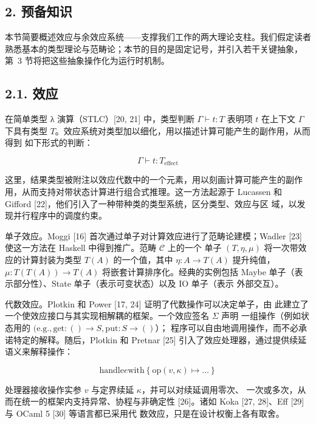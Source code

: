 \subsection{2. 预备知识}\label{preliminaries}

本节简要概述效应与余效应系统——支撑我们工作的两大理论支柱。我们假定读者
熟悉基本的类型理论与范畴论；本节的目的是固定记号，并引入若干关键抽象，
第~3 节将把这些抽象操作化为运行时机制。

\subsection{2.1. 效应}\label{efects}

在简单类型 λ 演算（STLC）{[}20, 21{]} 中，类型判断
\(\Gamma \vdash t : T\) 表明项 \(t\) 在上下文 $\Gamma$ 下具有类型
\(T\)。效应系统对类型加以细化，用以描述计算可能产生的副作用，从而得到
如下形式的判断：

\[
\Gamma \vdash t : T _ { \mathrm { e f f e c t } }\tag{1}
\]

这里，结果类型被附注以效应代数中的一个元素，用以刻画计算可能产生的副作
用，从而支持对带状态计算进行组合式推理。这一方法起源于 Lucassen 和
Gifford {[}22{]}，他们引入了一种带种类的类型系统，区分类型、效应与区
域，以发现并行程序中的调度约束。

单子效应。Moggi {[}16{]} 首次通过单子对计算效应进行了范畴论建模；Wadler
{[}23{]} 使这一方法在 Haskell 中得到推广。范畴 \(\mathcal{C}\) 上的一个
单子 \(( T , \eta , \mu )\) 将一次带效应的计算封装为类型 \(T ( A )\)
的一个值，其中 \(\eta : A \to T ( A )\) 提升纯值，
\(\mu : T ( T ( A ) ) \to T ( A )\) 将嵌套计算排序化。经典的实例包括
Maybe 单子（表示部分性）、State 单子（表示可变状态）以及 IO 单子（表示
外部交互）。

代数效应。Plotkin 和 Power {[}17, 24{]} 证明了代数操作可以决定单子，由
此建立了一个使效应接口与其实现相解耦的框架。一个效应签名 $\Sigma$ 声明
一组操作（例如状态用的
\(( \mathrm { e . g . , g e t : } ( ) \to S , \mathrm { p u t : } S \to ( )\)）；
程序可以自由地调用操作，而不必承诺特定的解释。随后，Plotkin 和 Pretnar
{[}25{]} 引入了效应处理器，通过提供续延语义来解释操作：

\[
\mathrm { h a n d l e } e \mathrm { w i t h } \left\{ \mathrm { o p } ( v , \kappa ) \mapsto \dots \right\}\tag{2}
\]

处理器接收操作实参 \(v\) 与定界续延 \(\kappa\)，并可以对续延调用零次、
一次或多次，从而在统一的框架内支持异常、协程与非确定性 {[}26{]}。诸如
Koka {[}27, 28{]}、Eff {[}29{]} 与 OCaml 5 {[}30{]} 等语言都已采用代
数效应，只是在设计权衡上各有取舍。

